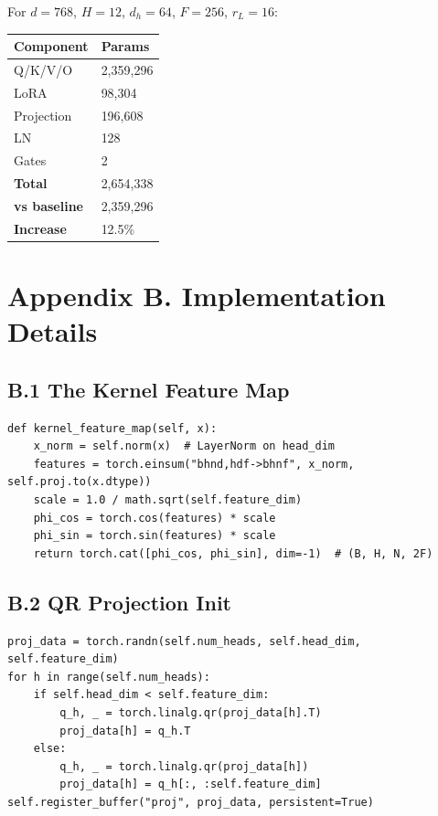 For $d = 768$, $H = 12$, $d_h = 64$, $F = 256$, $r_L = 16$:

\begin{table}[H]
\centering
\small
\begin{tabular}{ll}
\toprule
\textbf{Component} & \textbf{Params} \\
\midrule
Q/K/V/O & 2,359,296 \\
LoRA & 98,304 \\
Projection & 196,608 \\
LN & 128 \\
Gates & 2 \\
\textbf{Total} & 2,654,338 \\
\textbf{vs baseline} & 2,359,296 \\
\textbf{Increase} & 12.5\% \\
\bottomrule
\end{tabular}
\end{table}



\section{Appendix B. Implementation Details}

\subsection{B.1 The Kernel Feature Map}

\begin{lstlisting}
def kernel_feature_map(self, x):
    x_norm = self.norm(x)  # LayerNorm on head_dim
    features = torch.einsum("bhnd,hdf->bhnf", x_norm, self.proj.to(x.dtype))
    scale = 1.0 / math.sqrt(self.feature_dim)
    phi_cos = torch.cos(features) * scale
    phi_sin = torch.sin(features) * scale
    return torch.cat([phi_cos, phi_sin], dim=-1)  # (B, H, N, 2F)
\end{lstlisting}

\subsection{B.2 QR Projection Init}

\begin{lstlisting}
proj_data = torch.randn(self.num_heads, self.head_dim, self.feature_dim)
for h in range(self.num_heads):
    if self.head_dim < self.feature_dim:
        q_h, _ = torch.linalg.qr(proj_data[h].T)
        proj_data[h] = q_h.T
    else:
        q_h, _ = torch.linalg.qr(proj_data[h])
        proj_data[h] = q_h[:, :self.feature_dim]
self.register_buffer("proj", proj_data, persistent=True)
\end{lstlisting}

